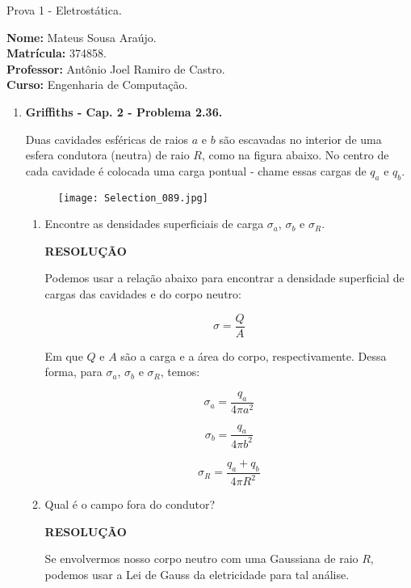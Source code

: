 \documentclass[11pt,a4paper]{article}
\begin{document}
	\begin{center}
		\Large  Prova 1 - Eletrostática. 
	\end{center}

\begin{flushleft}
\textbf{Nome:} Mateus Sousa Araújo. \\
\textbf{Matrícula:} 374858. \\
\textbf{Professor:} Antônio Joel Ramiro de Castro. \\
\textbf{Curso:} Engenharia de Computação. \\
\end{flushleft}

\begin{enumerate}

\item \textbf{Griffiths - Cap. 2 - Problema 2.36.}

Duas cavidades esféricas de raios $a$ e $b$ são escavadas no interior de uma esfera condutora (neutra) de raio $R$, como na figura abaixo. No centro de cada cavidade é colocada uma carga pontual - chame essas cargas de $q_a$ e $q_b$.

\begin{figure}[h]	
\centering %
\texttt{[image: Selection\_089.jpg]} 
\end{figure}

\begin{enumerate}
\item Encontre as densidades superficiais de carga $\sigma_a$, $\sigma_b$ e $\sigma_R$. 


\textbf{RESOLUÇÃO}

Podemos usar a relação abaixo para encontrar a densidade superficial de cargas das cavidades e do corpo neutro:

$$\sigma = \displaystyle\dfrac{Q}{A}$$

Em que $Q$ e $A$ são a carga e a área do corpo, respectivamente. Dessa forma, para $\sigma_a$, $\sigma_b$ e $\sigma_R$, temos:

$$\sigma_a = \displaystyle\dfrac{q_a}{4\pi a^2}$$

$$\sigma_b = \displaystyle\dfrac{q_a}{4\pi b^2}$$

$$\sigma_R = \displaystyle\dfrac{q_a + q_b}{4\pi R^2}$$

\item Qual é o campo fora do condutor?


\textbf{RESOLUÇÃO}

Se envolvermos nosso corpo neutro com uma Gaussiana de raio $R$, podemos usar a Lei de Gauss da eletricidade para tal análise. 


\end{enumerate}
\end{enumerate}
\end{document}
